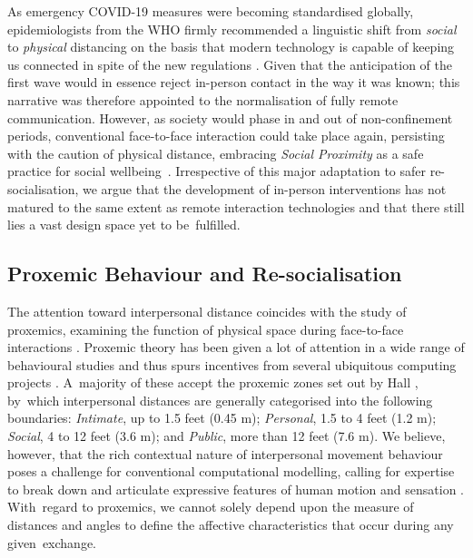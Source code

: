 As emergency COVID-19 measures were becoming standardised globally, epidemiologists from the WHO firmly recommended a linguistic shift from \textit{social} to \textit{physical} distancing on the basis that modern technology is capable of keeping us connected in spite of the new regulations \citep{romania_interactional_2020}. Given that the anticipation of the first wave would in essence reject in-person contact in the way it was known; this narrative was therefore appointed to the normalisation of fully remote communication. However, as society would phase in and out of non-confinement periods, conventional face-to-face interaction could take place again, persisting with the caution of physical distance, embracing \textit{Social Proximity} as a safe practice for social wellbeing~\cite{long_covid-19_2021}. Irrespective of this major adaptation to safer re-socialisation, we argue that the development of in-person interventions has not matured to the same extent as remote interaction technologies and that there still lies a vast design space yet to be~fulfilled.

\subsection*{Proxemic Behaviour and Re-socialisation}
\label{subsec:Proxemic}

The attention toward interpersonal distance coincides with the study of proxemics, examining the function of physical space during face-to-face interactions \citep{hall_hidden_1966, guerrero_proxemics_2015}. Proxemic theory has been given a lot of attention in a wide range of behavioural studies \citep{mccall_mapping_2017} and thus spurs incentives from several ubiquitous computing projects \citep{perez_mobile_2020, marquardt_proxemic_2015}. A~majority of these accept the proxemic zones set out by Hall \cite{hall_hidden_1966}, by~which interpersonal distances are generally categorised into the following boundaries: \textit{Intimate}, up to 1.5 feet (0.45 m); \textit{Personal}, 1.5 to 4 feet (1.2 m); \textit{Social}, 4 to 12 feet (3.6 m); and \textit{Public}, more than 12 feet (7.6 m). We believe, however, that the rich contextual nature of interpersonal movement behaviour poses a challenge for conventional computational modelling, calling for expertise to break down and articulate expressive features of human motion and sensation \citep{fdili_alaoui_how_2015,schiphorst_self-evidence_2011}. With~regard to proxemics, we cannot solely depend upon the measure of distances and angles to define the affective characteristics that occur during any given~exchange.

